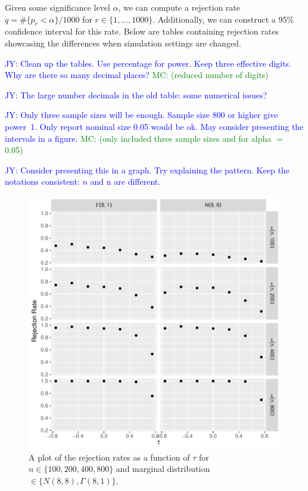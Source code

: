 \documentclass[12pt, titlepage, letterpaper]{article}
\newcommand{\jy}[1]{\textcolor{blue}{JY: #1}}
\newcommand{\mc}[1]{\textcolor{green}{MC: (#1)}}
\begin{document}
{Given some significance level $\alpha$, we can compute a rejection rate 
$q = \#\{p_r < \alpha\} / 1000$ for $r \in \{1, \ldots, 1000\}$.
Additionally, we can construct a 95\% confidence interval for 
this rate. Below are tables containing rejection rates showcasing the 
differences when simulation settings are changed.

\jy{Clean up the tables. Use percentage for power. Keep three effective
  digits. Why are there so many decimal places? }
\mc{reduced number of digits}

\jy{The large number decimals in the old table: some numerical issues?}

\jy{Only three sample sizes will be enough. Sample size 800 or higher give
  power~1. Only report nominal size 0.05 would be ok. May consider presenting
  the intervals in a figure.}
\mc{only included three sample sizes and for alpha $=$ 0.05}


\jy{Consider presenting this in a graph. Try explaining the pattern.
  Keep the notations consistent: $n$ and n are different.}


\begin{figure}[tbp]
  \centering
  \includegraphics[scale=1]{figures/rr}
  \caption{A plot of the rejection rates as a function of $\tau$ for
 $n \in \{100, 200, 400, 800\}$ and marginal distribution 
 $\in \{N(8,8), \Gamma(8,1)\}$.}
  \label{fig:rr}
\end{figure}


}
\end{document}
